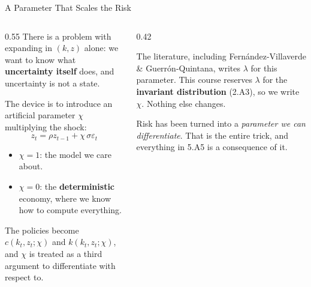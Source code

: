 \begin{frame}{A Parameter That Scales the Risk}
\begin{columns}[T]
\begin{column}{0.55\textwidth}
\small
There is a problem with expanding in $(k,z)$ alone: we want to know what \textbf{uncertainty itself} does, and uncertainty is not a state.
\medskip

The device is to introduce an artificial parameter $\chi$ multiplying the shock:
\[
  z_{t}=\rho z_{t-1}+\chi\,\sigma\varepsilon_{t}
\]
\begin{itemize}\small
  \item $\chi=1$: the model we care about.
  \item $\chi=0$: the \textbf{deterministic} economy, where we know how to compute everything.
\end{itemize}
\medskip
The policies become $c(k_t,z_t;\chi)$ and $k(k_t,z_t;\chi)$, and $\chi$ is treated as a third argument to differentiate with respect to.
\end{column}
\begin{column}{0.42\textwidth}
\begin{cautionbox}[title=\textbf{Notation}]\footnotesize
The literature, including Fern\'andez-Villaverde \& Guerr\'on-Quintana, writes $\lambda$ for this parameter. This course reserves $\lambda$ for the \textbf{invariant distribution} (2.A3), so we write $\chi$. Nothing else changes.
\end{cautionbox}
\medskip
\begin{conceptbox}[title=\textbf{The move}]\footnotesize
Risk has been turned into a \emph{parameter we can differentiate}. That is the entire trick, and everything in 5.A5 is a consequence of it.
\end{conceptbox}
\end{column}
\end{columns}
\vspace{1mm}
\end{frame}

